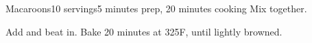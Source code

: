 \documentclass[../Cookbook.tex]{subfiles}
\begin{document}
\begin{recipe}[Macaroons]{Macaroons}{10 servings}{5 minutes prep, 20 minutes cooking}
Mix together.

Add and beat in.
Bake 20 minutes at 325\0F, until lightly browned.
\end{recipe}
\end{document}
